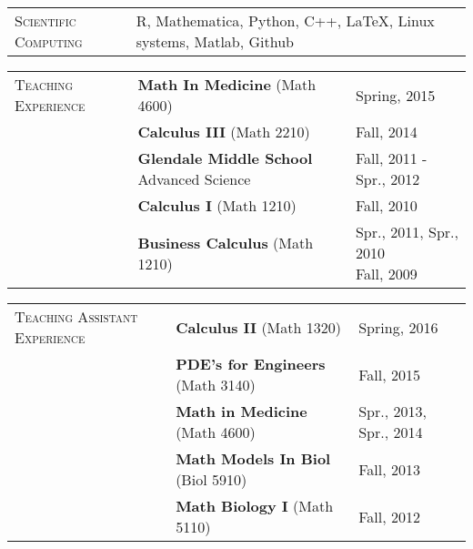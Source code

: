 \documentclass[11pt]{article}
\newcommand{\cellone}{3.5cm} %
\newcommand{\celltwo}{11cm}
\newcommand{\cellthree}{4cm}
\newcommand{\latex}{\LaTeX}
\newcommand{\spa}{\vspace{.4in}}
\begin{document}
\spa

\begin{tabularx}{\textwidth}{p{\cellone} p{\celltwo} p{\cellthree}}
\parbox[t][0cm]{\cellone}{S\textsc{cientific} C\textsc{omputing}} & \parbox[t][0cm]{\celltwo}{R, Mathematica, Python, C++, \latex, Linux systems, Matlab, Github} 
\end{tabularx}

\spa

\begin{tabularx}{\textwidth}{p{\cellone} p{\celltwo} p{\cellthree}}

\parbox[t][0cm]{\cellone}{T\textsc{eaching} E\textsc{xperience}} &  \parbox[t][0cm]{\celltwo}{{\bf  Math In Medicine} (Math 4600)}  &  Spring, 2015 \\ 
					          &  \parbox[t][0cm]{\celltwo}{{\bf  Calculus III} (Math 2210)} &  Fall, 2014 \\
					          &  \parbox[t]{\celltwo}{{\bf Glendale Middle School} Advanced Science}   &  \parbox[t]{\cellthree}{Fall, 2011 - Spr., 2012} \\				
					          &  \parbox[t]{\celltwo}{{\bf Calculus I} (Math 1210)}   &  \parbox[t]{\cellthree}{Fall, 2010} \\					          
					          &  \parbox[t]{\celltwo}{{\bf  Business Calculus} (Math 1210)}   &  \parbox[t]{\cellthree}{Spr., 2011, Spr., 2010 \\ Fall, 2009 }

\end{tabularx}

\spa

\begin{tabularx}{\textwidth}{p{\cellone} p{\celltwo} p{\cellthree}}
  
  \parbox[t][0cm]{\cellone}{T\textsc{eaching} A\textsc{ssistant} E\textsc{xperience}} & \parbox[t][0cm]{\celltwo}{{\bf  Calculus II} (Math 1320)}  &  \parbox[t][]{\cellthree}{Spring, 2016}\\ 
  
  
  & \parbox[t][0cm]{\celltwo}{{\bf  PDE's for Engineers} (Math 3140)}  &  \parbox[t][]{\cellthree}{Fall, 2015}\\ 
  
  &  \parbox[t][0cm]{\celltwo}{{\bf  Math in Medicine} (Math 4600)}  &  \parbox[t][]{\cellthree}{Spr., 2013, Spr., 2014}\\  
  &  \parbox[t][0cm]{\celltwo}{{\bf  Math Models In Biol} (Biol 5910)}  &  \parbox[t][]{\cellthree}{Fall, 2013} \\ 					          
  &  \parbox[t][1cm]{\celltwo}{{\bf  Math Biology I} (Math 5110)}  &  Fall, 2012 
\end{tabularx}
\end{document}
